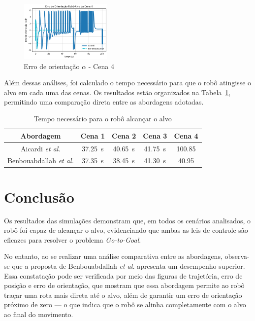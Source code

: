 \documentclass[conference]{IEEEtran}
\begin{document}
\begin{figure}[h!]
    \centering
    \includegraphics[width=0.4\textwidth]{Figuras/ErroOrientação_Cena_4.png}
    \caption{Erro de orientação $\alpha$ - Cena 4}
    \label{fig:ErroOrientação_Cena_4}
\end{figure}

Além dessas análises, foi calculado o tempo necessário para que o robô atingisse o alvo em cada uma das cenas. Os resultados estão organizados na Tabela~\ref{tab:Tabela_Comparacao_Tempo}, permitindo uma comparação direta entre as abordagens adotadas.

\begin{table}[h!]
    \centering
    \caption{Tempo necessário para o robô alcançar o alvo}
    \label{tab:Tabela_Comparacao_Tempo}
    \begin{tabular}{|c|c|c|c|c|}
        \hline
        \textbf{Abordagem} & \textbf{Cena 1} & \textbf{Cena 2} & \textbf{Cena 3} & \textbf{Cena 4}\\
        \hline
        Aicardi \textit{et al.} & 37.25~s & 40.65~s & 41.75~s & 100.85\\
        \hline
        Benbouabdallah \textit{et al.} & 37.35~s & 38.45~s & 41.30~s & 40.95\\
        \hline
    \end{tabular}
\end{table}

\section{Conclusão}

Os resultados das simulações demonstram que, em todos os cenários analisados, o robô foi capaz de alcançar o alvo, evidenciando que ambas as leis de controle são eficazes para resolver o problema \textit{Go-to-Goal}.

No entanto, ao se realizar uma análise comparativa entre as abordagens, observa-se que a proposta de Benbouabdallah \textit{et al.} apresenta um desempenho superior. Essa constatação pode ser verificada por meio das figuras de trajetória, erro de posição e erro de orientação, que mostram que essa abordagem permite ao robô traçar uma rota mais direta até o alvo, além de garantir um erro de orientação próximo de zero — o que indica que o robô se alinha completamente com o alvo ao final do movimento.
\end{document}
